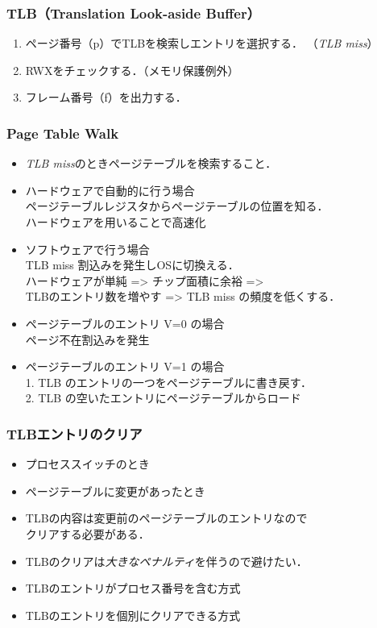\documentclass[unicode,handout]{beamer}                   %
\begin{document}
\begin{frame}
  \frametitle{TLB（Translation Look-aside Buffer）}
  \begin{enumerate}
  \item[1)] ページ番号（p）でTLBを検索しエントリを選択する．
    （\emph{TLB miss}）
  \item[2)] RWXをチェックする．（メモリ保護例外）
  \item[3)] フレーム番号（f）を出力する．
  \end{enumerate}
\end{frame}

\begin{frame}
  \frametitle{Page Table Walk}
  \begin{itemize}
  \item \emph{TLB miss}のときページテーブルを検索すること．
  \item ハードウェアで自動的に行う場合 \\
    ページテーブルレジスタからページテーブルの位置を知る． \\
    ハードウェアを用いることで高速化
  \item ソフトウェアで行う場合 \\
    TLB miss 割込みを発生しOSに切換える．　\\
    ハードウェアが単純 => チップ面積に余裕 => \\
    TLBのエントリ数を増やす => TLB miss の頻度を低くする．
  \item ページテーブルのエントリ V=0 の場合 \\
    ページ不在割込みを発生 \\
  \item ページテーブルのエントリ V=1 の場合 \\
    1. TLB のエントリの一つをページテーブルに書き戻す． \\
    2. TLB の空いたエントリにページテーブルからロード
  \end{itemize}
\end{frame}

\begin{frame}
  \frametitle{TLBエントリのクリア}
  \begin{itemize}
  \item プロセススイッチのとき
  \item ページテーブルに変更があったとき
  \item TLBの内容は変更前のページテーブルのエントリなので \\
    クリアする必要がある．
  \item TLBのクリアは\emph{大きなペナルティ}を伴うので避けたい．
  \item TLBのエントリがプロセス番号を含む方式
  \item TLBのエントリを個別にクリアできる方式
  \end{itemize}
\end{frame}
\end{document}
